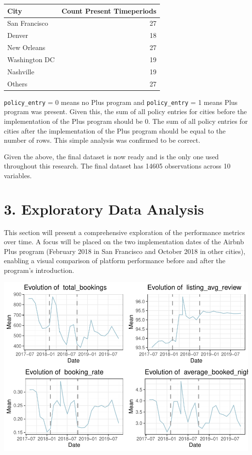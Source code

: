 \documentclass[
  12pt,
]{article}
\begin{document}
\begin{longtable}[]{@{}lr@{}}
\toprule\noalign{}
City & Count Present Timeperiods \\
\midrule\noalign{}
\endhead
\bottomrule\noalign{}
\endlastfoot
San Francisco & 27 \\
Denver & 18 \\
New Orleans & 27 \\
Washington DC & 19 \\
Nashville & 19 \\
Others & 27 \\
\end{longtable}

\texttt{policy\_entry} = 0 means no Plus program and
\texttt{policy\_entry} = 1 means Plus program was present. Given this,
the sum of all policy entries for cities before the implementation of
the Plus program should be 0. The sum of all policy entries for cities
after the implementation of the Plus program should be equal to the
number of rows. This simple analysis was confirmed to be correct.

Given the above, the final dataset is now ready and is the only one used
throughout this research. The final dataset has 14605 observations
across 10 variables.

\newpage

\section{3. Exploratory Data Analysis}\label{exploratory-data-analysis}

This section will present a comprehensive exploration of the performance
metrics over time. A focus will be placed on the two implementation
dates of the Airbnb Plus program (February 2018 in San Francisco and
October 2018 in other cities), enabling a visual comparison of platform
performance before and after the program's introduction.

\includegraphics{Group-D---Assignment-1_files/figure-latex/unnamed-chunk-11-1.pdf}
\end{document}

